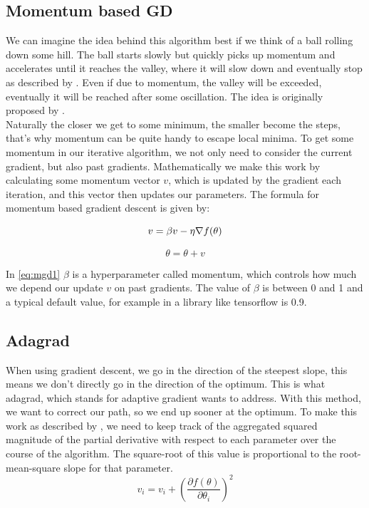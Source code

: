 \documentclass[aodsor,preprint]{imsart}
\numberwithin{equation}{section}
\theoremstyle{plain}
\begin{document}
\subsection{Momentum based GD}
We can imagine the idea behind this algorithm best if we think of a ball rolling down some hill. The ball starts slowly but quickly picks up momentum and accelerates until it reaches the valley, where it will slow down and eventually stop as described by \cite{geron2019hands}. Even if due to momentum, the valley will be exceeded, eventually it will be reached after some oscillation. The idea is originally proposed by \cite{polyak}.\\
Naturally the closer we get to some minimum, the smaller become the steps, that's why momentum can be quite handy to escape local minima. To get some momentum in our iterative algorithm, we not only need to consider the current gradient, but also past gradients. Mathematically we make this work by calculating some momentum vector $v$, which is updated by the gradient each iteration, and this vector then updates our parameters. The formula for momentum based gradient descent is given by:

\begin{equation} \label{eq:mgd1}
v = \beta v - \eta \nabla f(\theta) \\
\end{equation}

\begin{equation} \label{eq:mgd2}
\theta = \theta + v
\end{equation}

In \ref{eq:mgd1} $\beta$ is a hyperparameter called momentum, which controls how much we depend our update $v$ on past gradients. The value of $\beta$ is between 0 and 1 and a typical default value, for example in a library like tensorflow is 0.9.

\subsection{Adagrad}\label{adagrad}
When using gradient descent, we go in the direction of the steepest slope, this means we don't directly go in the direction of the optimum. This is what adagrad, which stands for adaptive gradient wants to address. With this method, we want to correct our path, so we end up sooner at the optimum. To make this work as described by \cite{Aggarwal18}, we need to keep track of the aggregated squared magnitude of the partial derivative with respect to each parameter over the course of the algorithm. The square-root of this value is proportional to the root-mean-square slope for that parameter.
\begin{equation} \label{eq:adagrad1}
v_{i} = v_{i} + \left(\frac{\partial f(\theta)}{\partial \theta_{i}}\right)^2
\end{equation}
\end{document}

